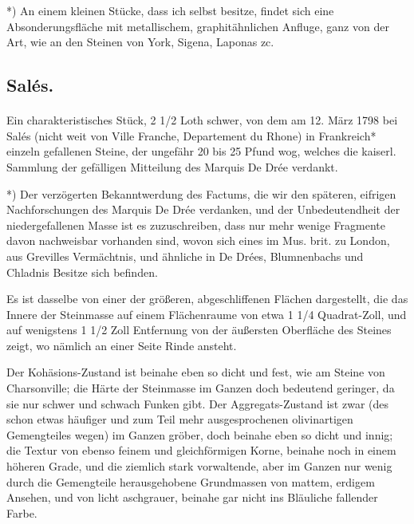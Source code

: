 \documentclass[a4paper, 11pt, oneside, german]{article}
\begin{document}
*) An einem kleinen Stücke, dass ich selbst besitze, findet sich eine Absonderungsfläche mit metallischem, graphitähnlichen Anfluge, ganz von der Art, wie an den Steinen von York, Sigena, Laponas zc.

\subsection{Salés.}
\paragraph{}
Ein charakteristisches Stück, 2 1/2 Loth schwer, von dem am 12. März 1798 bei Salés (nicht weit von Ville Franche, Departement du Rhone) in Frankreich* einzeln gefallenen Steine, der ungefähr 20 bis 25 Pfund wog, welches die kaiserl. Sammlung der gefälligen Mitteilung des Marquis De Drée verdankt.

*) Der verzögerten Bekanntwerdung des Factums, die wir den späteren, eifrigen Nachforschungen des Marquis De Drée verdanken, und der Unbedeutendheit der niedergefallenen Masse ist es zuzuschreiben, dass nur mehr wenige Fragmente davon nachweisbar vorhanden sind, wovon sich eines im Mus. brit. zu London, aus Grevilles Vermächtnis, und ähnliche in De Drées, Blumnenbachs und Chladnis Besitze sich befinden.

Es ist dasselbe von einer der größeren, abgeschliffenen Flächen dargestellt, die das Innere der Steinmasse auf einem Flächenraume von etwa 1 1/4 Quadrat-Zoll, und auf wenigstens 1 1/2 Zoll Entfernung von der äußersten Oberfläche des Steines zeigt, wo nämlich an einer Seite Rinde ansteht.

Der Kohäsions-Zustand ist beinahe eben so dicht und fest, wie am Steine von Charsonville; die Härte der Steinmasse im Ganzen doch bedeutend geringer, da sie nur schwer und schwach Funken gibt. Der Aggregats-Zustand ist zwar (des schon etwas häufiger und zum Teil mehr ausgesprochenen olivinartigen Gemengteiles wegen) im Ganzen gröber, doch beinahe eben so dicht und innig; die Textur von ebenso feinem und gleichförmigen Korne, beinahe noch in einem höheren Grade, und die ziemlich stark vorwaltende, aber im Ganzen nur wenig durch die Gemengteile herausgehobene Grundmassen von mattem, erdigem Ansehen, und von licht aschgrauer, beinahe gar nicht ins Bläuliche fallender Farbe.
\end{document}

